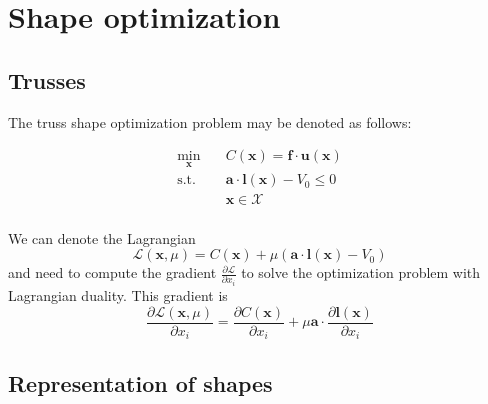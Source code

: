 \chapter{Shape optimization}

\section{Trusses}

The truss shape optimization problem may be denoted as follows:

\begin{equation}
    \begin{aligned}
        \min_{\mathbf{x}} \quad & C(\mathbf{x}) = \mathbf{f} \cdot \mathbf{u}(\mathbf{x})\\
        \textrm{s.t.} \quad & \mathbf{a} \cdot \mathbf{l}(\mathbf{x}) - V_0 \le 0  \\
                            & \mathbf{x} \in \mathcal{X}\\
    \end{aligned}
    \label{eq:shape_optimization}
\end{equation}

We can denote the Lagrangian 
\begin{equation}
    \mathcal{L}(\mathbf{x}, \mu) = C(\mathbf{x}) + \mu \left( \mathbf{a} \cdot \mathbf{l}(\mathbf{x}) - V_0 \right) 
\end{equation}
and need to compute the gradient $\frac{\partial \mathcal{L}}{\partial x_i}$ to solve the optimization problem with Lagrangian duality. This gradient is 
\begin{equation}
    \frac{\partial \mathcal{L} (\mathbf{x}, \mu)}{\partial x_i} 
    = \frac{\partial C (\mathbf{x})}{\partial x_i} + \mu \mathbf{a} \cdot \frac{\partial \mathbf{l}(\mathbf{x})}{\partial x_i}
    \label{eq:lagrange_truss_shape_problem}
\end{equation}



\section{Representation of shapes}

\section{}